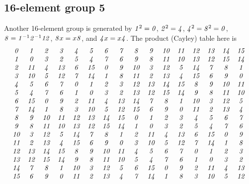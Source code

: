 \documentclass[12pt]{article}
\begin{document}
\subsection{16-element group 5}
 Another 16-element group is generated by
$\G1^2 = \G0$, $\G2^2 = \G4$, $\G4^2=\G8^2=\G0$, $\G8=\G1^{-1}\G2^{-1}\G1\G2$,
$\G8x = x\G8$, and  $\G4x = x\G4$.  The product (Cayley) table here is
\begin{displaymath}
\begin{array}{cccccccccccccccc}
\G0&  \G1&  \G2&  \G3&  \G4&  \G5&  \G6&  \G7&  \G8&  \G9& \G1\G0& \G1\G1& \G1\G2& \G1\G3& \G1\G4& \G1\G5 \\
\G1&  \G0&  \G3&  \G2&  \G5&  \G4&  \G7&  \G6&  \G9&  \G8& \G1\G1& \G1\G0& \G1\G3& \G1\G2& \G1\G5& \G1\G4 \\
\G2& \G1\G1&  \G4& \G1\G3&  \G6& \G1\G5&  \G0&  \G9& \G1\G0&  \G3& \G1\G2&  \G5& \G1\G4&  \G7&  \G8&  \G1 \\
\G3& \G1\G0&  \G5& \G1\G2&  \G7& \G1\G4&  \G1&  \G8& \G1\G1&  \G2& \G1\G3& \G4& \G1\G5&  \G6&  \G9&  \G0 \\
\G4&  \G5&  \G6&  \G7&  \G0&  \G1&  \G2&  \G3& \G1\G2& \G1\G3& \G1\G4& \G1\G5&  \G8&  \G9& \G1\G0& \G1\G1 \\
\G5&  \G4&  \G7&  \G6&  \G1&  \G0&  \G3&  \G2& \G1\G3& \G1\G2& \G1\G5& \G1\G4&  \G9&  \G8& \G1\G1& \G1\G0 \\
\G6& \G1\G5&  \G0&  \G9&  \G2& \G1\G1&  \G4& \G1\G3& \G1\G4&  \G7&  \G8&  \G1& \G1\G0&  \G3& \G1\G2&  \G5 \\
\G7& \G1\G4&  \G1&  \G8&  \G3& \G1\G0&  \G5& \G1\G2& \G1\G5&  \G6&  \G9&  \G0& \G1\G1&  \G2& \G1\G3&  \G4 \\
\G8&  \G9& \G1\G0& \G1\G1& \G1\G2& \G1\G3& \G1\G4& \G1\G5&  \G0&  \G1&  \G2&  \G3&  \G4&  \G5&  \G6&  \G7 \\
\G9&  \G8& \G1\G1& \G1\G0& \G1\G3& \G1\G2& \G1\G5& \G1\G4&  \G1&  \G0&  \G3&  \G2&  \G5&  \G4&  \G7&  \G6 \\
\G1\G0&  \G3& \G1\G2&  \G5& \G1\G4&  \G7&  \G8&  \G1&  \G2& \G1\G1&  \G4& \G1\G3&  \G6& \G1\G5&  \G0&  \G9 \\
\G1\G1&  \G2& \G1\G3&  \G4& \G1\G5&  \G6&  \G9&  \G0&  \G3& \G1\G0&  \G5& \G1\G2&  \G7& \G1\G4&  \G1&  \G8 \\
\G1\G2& \G1\G3& \G1\G4& \G1\G5&  \G8&  \G9& \G1\G0& \G1\G1&  \G4&  \G5&  \G6&  \G7&  \G0&  \G1&  \G2&  \G3 \\
\G1\G3& \G1\G2& \G1\G5& \G1\G4&  \G9&  \G8& \G1\G1& \G1\G0&  \G5&  \G4&  \G7&  \G6&  \G1&  \G0&  \G3&  \G2 \\
\G1\G4&  \G7&  \G8&  \G1& \G1\G0&  \G3& \G1\G2&  \G5&  \G6& \G1\G5&  \G0&  \G9&  \G2& \G1\G1&  \G4& \G1\G3\\
\G1\G5&  \G6&  \G9&  \G0& \G1\G1&  \G2& \G1\G3&  \G4&  \G7& \G1\G4&  \G1&  \G8&  \G3& \G1\G0&  \G5& \G1\G2
\end{array}
\end{displaymath}
\end{document}
